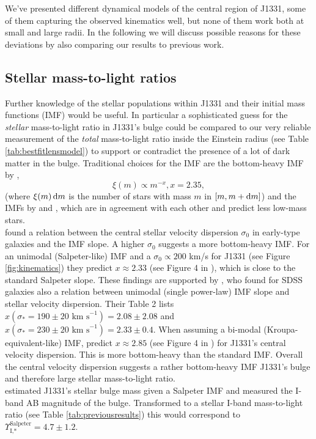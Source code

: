 We've presented different dynamical models of the central region of J1331, some of them capturing the observed kinematics well, but none of them work both at small and large radii. In the following we will discuss possible reasons for these deviations by also comparing our results to previous work.

\subsection{Stellar mass-to-light ratios}

Further knowledge of the stellar populations within J1331 and their initial mass functions (IMF) would be useful. In particular a sophisticated guess for the \emph{stellar} mass-to-light ratio in J1331's bulge could be compared to our very reliable measurement of the \emph{total} mass-to-light ratio inside the Einstein radius (see Table \ref{tab:bestfitlensmodel}) to support or contradict the presence of a lot of dark matter in the bulge. Traditional choices for the IMF are the bottom-heavy IMF by \citet{Salpeter1955},
$$\xi(m) \propto m^{-x}, x=2.35,$$
(where $\xi(m) \mathop{}\!\mathrm{d} m$ is the number of stars with mass $m$ in $[m,m+\mathop{}\!\mathrm{d} m]$) and the IMFs by \citet{2002Sci...295...82K} and \citet{Chabrier2003}, which are in agreement with each other and predict less low-mass stars. \\\citet{Ferreras} found a relation between the central stellar velocity dispersion $\sigma_0$ in early-type galaxies and the IMF slope. A higher $\sigma_0$ suggests a more bottom-heavy IMF. For an unimodal (Salpeter-like) IMF and a $\sigma_0 \propto 200 $ km/s for J1331 (see Figure \ref{fig:kinematics}) they predict $x \approx 2.33$ (see Figure 4 in \citet{Ferreras}), which is close to the standard Salpeter slope. These findings are supported by \citet{2014MNRAS.438.1483S}, who found for SDSS galaxies also a relation between unimodal (single power-law) IMF slope and stellar velocity dispersion. Their Table 2 lists $x(\sigma_*=190 \pm 20 \text{ km s}^{-1}) = 2.08 \pm 2.08$ and $x(\sigma_*= 230 \pm 20 \text{ km s}^{-1}) = 2.33 \pm 0.4$. When assuming a bi-modal (Kroupa-equivalent-like) IMF, \citet{Ferreras} predict $x \approx 2.85$ (see Figure 4 in \citet{Ferreras}) for J1331's central velocity dispersion. This is more bottom-heavy than the standard \citet{2002Sci...295...82K} IMF. Overall the central velocity dispersion suggests a rather bottom-heavy IMF J1331's bulge and therefore large stellar mass-to-light ratio.
\\ \citet{SWELLSI} estimated J1331's stellar bulge mass given a Salpeter IMF and measured the I-band AB magnitude of the bulge. Transformed to a stellar I-band mass-to-light ratio (see Table \ref{tab:previousresults}) this would correspond to $\Upsilon_\text{I,*}^\text{Salpeter} = 4.7 \pm 1.2$.
